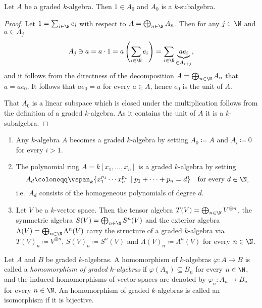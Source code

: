 \begin{lemma}
 Let $A$ be a graded $k$-algebra. Then $1 \in A_0$ and $A_0$ is a $k$-subalgebra.
\end{lemma}
\begin{proof}
 Let $1 = \sum_{i \in \N} e_i$ with respect to $A = \bigoplus_{n \in \N} A_n$. Then for any $j \in \N$ and $a \in A_j$
 \[
  A_j \ni a
  = a \cdot 1
  = a \left( \sum_{i \in \N} e_i \right)
  = \sum_{i \in \N} \underbrace{a e_i}_{\in A_{i+j}},
 \]
 and it follows from the directness of the decomposition $A = \bigoplus_{n \in \N} A_n$ that $a = a e_0$. It follows that $a e_0 = a$ for every $a \in A$, hence $e_0$ is the unit of $A$.
 
 That $A_0$ is a linear subspace which is closed under the multiplication follows from the definition of a graded $k$-algebra. As it contains the unit of $A$ it is a $k$-subalgebra.
\end{proof}


\begin{examples}\label{expls: graded algebras}
 \begin{enumerate}[leftmargin=*]
  \item
   Any $k$-algebra $A$ becomes a graded $k$-algebra by setting $A_0 \coloneqq A$ and $A_i \coloneqq 0$ for every $i > 1$.
  \item
   The polynomial ring $A = k[x_1, \dotsc, x_n]$ is a graded $k$-algebra by setting
   \[
    A_d \coloneqq \vspan_k \{ x_1^{p_1} \dotsm x_n^{p_n} \mid p_1 + \dotsb + p_n = d\}
    \quad \text{for every $d \in \N$},
   \]
   i.e.\ $A_d$ consists of the homogeneous polynomials of degree $d$.
  \item
   Let $V$ be a $k$-vector space. Then the tensor algebra $T(V) = \bigoplus_{n \in \N} V^{\otimes n}$, the symmetric algebra $S(V) = \bigoplus_{n \in \N} S^n(V)$ and the exterior algebra $\Lambda(V) = \bigoplus_{n \in \N} \Lambda^n(V)$ carry the structure of a graded $k$-algebra via $T(V)_n \coloneqq V^{\otimes n}$, $S(V)_n \coloneqq S^n(V)$ and $\Lambda(V)_n \coloneqq \Lambda^n(V)$ for every $n \in \N$.
 \end{enumerate}
\end{examples}


\begin{definition}
 Let $A$ and $B$ be graded $k$-algebras. A homomorphism of $k$-algebras $\varphi \colon A \to B$ is called a \emph{homomorphism of graded $k$-algebras} if $\varphi(A_n) \subseteq B_n$ for every $n \in \N$, and the induced homomorphisms of vector spaces are denoted by $\varphi_n \colon A_n \to B_n$ for every $n \in \N$. An homomorphism of graded $k$-algebras is called an isomorphism if it is bijective.
\end{definition}


